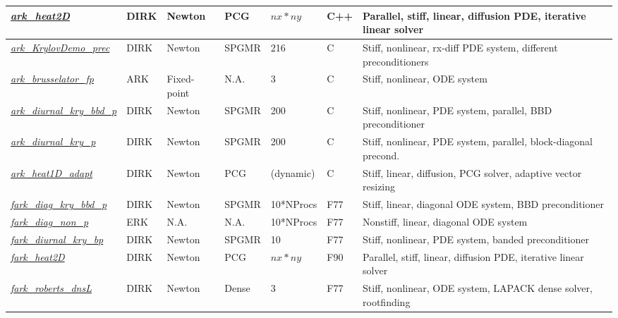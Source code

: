 \documentclass[letterpaper,10pt,english]{sphinxmanual}
\begin{document}
\begin{tabulary}{\linewidth}{|L|L|L|L|L|L|L|}
{\hyperref[ark_heat2D:ark-heat2d]{\emph{ark\_heat2D}}}
 & 
DIRK
 & 
Newton
 & 
PCG
 & 
$nx*ny$
 & 
C++
 & 
Parallel, stiff, linear, diffusion PDE, iterative linear solver
\\\hline

{\hyperref[ark_KrylovDemo_prec:ark-krylovdemo-prec]{\emph{ark\_KrylovDemo\_prec}}}
 & 
DIRK
 & 
Newton
 & 
SPGMR
 & 
216
 & 
C
 & 
Stiff, nonlinear, rx-diff PDE system, different preconditioners
\\\hline

{\hyperref[ark_brusselator_fp:ark-brusselator-fp]{\emph{ark\_brusselator\_fp}}}
 & 
ARK
 & 
Fixed-point
 & 
N.A.
 & 
3
 & 
C
 & 
Stiff, nonlinear, ODE system
\\\hline

{\hyperref[ark_diurnal_kry_bbd_p:ark-diurnal-kry-bbd-p]{\emph{ark\_diurnal\_kry\_bbd\_p}}}
 & 
DIRK
 & 
Newton
 & 
SPGMR
 & 
200
 & 
C
 & 
Stiff, nonlinear, PDE system, parallel, BBD preconditioner
\\\hline

{\hyperref[ark_diurnal_kry_p:ark-diurnal-kry-p]{\emph{ark\_diurnal\_kry\_p}}}
 & 
DIRK
 & 
Newton
 & 
SPGMR
 & 
200
 & 
C
 & 
Stiff, nonlinear, PDE system, parallel, block-diagonal precond.
\\\hline

{\hyperref[ark_heat1D_adapt:ark-heat1d-adapt]{\emph{ark\_heat1D\_adapt}}}
 & 
DIRK
 & 
Newton
 & 
PCG
 & 
(dynamic)
 & 
C
 & 
Stiff, linear, diffusion, PCG solver, adaptive vector resizing
\\\hline

{\hyperref[fark_diag_kry_bbd_p:fark-diag-kry-bbd-p]{\emph{fark\_diag\_kry\_bbd\_p}}}
 & 
DIRK
 & 
Newton
 & 
SPGMR
 & 
10*NProcs
 & 
F77
 & 
Stiff, linear, diagonal ODE system, BBD preconditioner
\\\hline

{\hyperref[fark_diag_non_p:fark-diag-non-p]{\emph{fark\_diag\_non\_p}}}
 & 
ERK
 & 
N.A.
 & 
N.A.
 & 
10*NProcs
 & 
F77
 & 
Nonstiff, linear, diagonal ODE system
\\\hline

{\hyperref[fark_diurnal_kry_bp:fark-diurnal-kry-bp]{\emph{fark\_diurnal\_kry\_bp}}}
 & 
DIRK
 & 
Newton
 & 
SPGMR
 & 
10
 & 
F77
 & 
Stiff, nonlinear, PDE system, banded preconditioner
\\\hline

{\hyperref[fark_heat2D:fark-heat2d]{\emph{fark\_heat2D}}}
 & 
DIRK
 & 
Newton
 & 
PCG
 & 
$nx*ny$
 & 
F90
 & 
Parallel, stiff, linear, diffusion PDE, iterative linear solver
\\\hline

{\hyperref[fark_roberts_dnsL:fark-roberts-dnsl]{\emph{fark\_roberts\_dnsL}}}
 & 
DIRK
 & 
Newton
 & 
Dense
 & 
3
 & 
F77
 & 
Stiff, nonlinear, ODE system, LAPACK dense solver, rootfinding
\\\hline
\end{tabulary}
\end{document}

